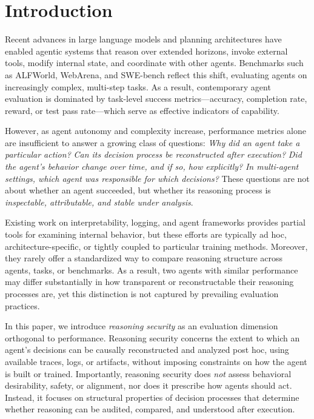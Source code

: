 \section{Introduction}
Recent advances in large language models and planning architectures have enabled agentic systems that reason over extended horizons, invoke external tools, modify internal state, and coordinate with other agents. Benchmarks such as ALFWorld, WebArena, and SWE-bench reflect this shift, evaluating agents on increasingly complex, multi-step tasks. As a result, contemporary agent evaluation is dominated by task-level success metrics---accuracy, completion rate, reward, or test pass rate---which serve as effective indicators of capability.

However, as agent autonomy and complexity increase, performance metrics alone are insufficient to answer a growing class of questions: \emph{Why did an agent take a particular action?} \emph{Can its decision process be reconstructed after execution?} \emph{Did the agent’s behavior change over time, and if so, how explicitly?} \emph{In multi-agent settings, which agent was responsible for which decisions?} These questions are not about whether an agent succeeded, but whether its reasoning process is \emph{inspectable, attributable, and stable under analysis}.

Existing work on interpretability, logging, and agent frameworks provides partial tools for examining internal behavior, but these efforts are typically ad hoc, architecture-specific, or tightly coupled to particular training methods. Moreover, they rarely offer a standardized way to compare reasoning structure across agents, tasks, or benchmarks. As a result, two agents with similar performance may differ substantially in how transparent or reconstructable their reasoning processes are, yet this distinction is not captured by prevailing evaluation practices.

In this paper, we introduce \emph{reasoning security} as an evaluation dimension orthogonal to performance. Reasoning security concerns the extent to which an agent’s decisions can be causally reconstructed and analyzed post hoc, using available traces, logs, or artifacts, without imposing constraints on how the agent is built or trained. Importantly, reasoning security does \emph{not} assess behavioral desirability, safety, or alignment, nor does it prescribe how agents should act. Instead, it focuses on structural properties of decision processes that determine whether reasoning can be audited, compared, and understood after execution.

